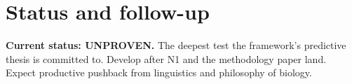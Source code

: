 \documentclass[11pt]{article}
\theoremstyle{plain}
\theoremstyle{definition}
\begin{document}
\section{Status and follow-up}

\textbf{Current status: UNPROVEN.} The deepest test the framework's
predictive thesis is committed to. Develop after N1 and the
methodology paper land. Expect productive pushback from linguistics
and philosophy of biology.



\end{document}
